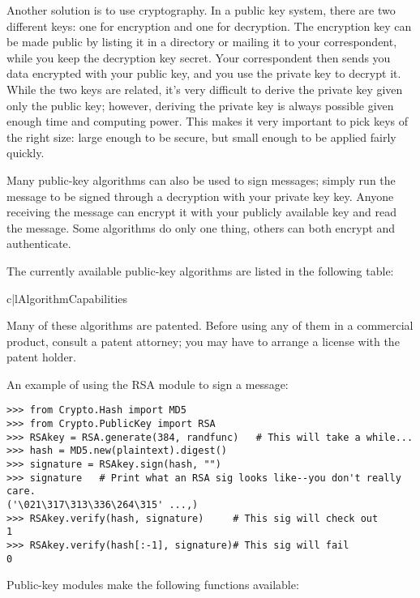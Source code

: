 \documentclass{howto}
\begin{document}
Another solution is to use  cryptography.  In a public
key system, there are two different keys: one for encryption and one for
decryption.  The encryption key can be made public by listing it in a
directory or mailing it to your correspondent, while you keep the
decryption key secret.  Your correspondent then sends you data encrypted
with your public key, and you use the private key to decrypt it.  While
the two keys are related, it's very difficult to derive the private key
given only the public key; however, deriving the private key is always
possible given enough time and computing power.  This makes it very
important to pick keys of the right size: large enough to be secure, but
small enough to be applied fairly quickly.

Many public-key algorithms can also be used to sign messages; simply
run the message to be signed through a decryption with your private
key key.  Anyone receiving the message can encrypt it with your
publicly available key and read the message.  Some algorithms do only
one thing, others can both encrypt and authenticate.

The currently available public-key algorithms are listed in the
following table:

\begin{tableii}{c|l}{}{Algorithm}{Capabilities}
\end{tableii}

Many of these algorithms are patented.  Before using any of them in a
commercial product, consult a patent attorney; you may have to arrange
a license with the patent holder.

An example of using the RSA module to sign a message:
\begin{verbatim}
>>> from Crypto.Hash import MD5
>>> from Crypto.PublicKey import RSA
>>> RSAkey = RSA.generate(384, randfunc)   # This will take a while...
>>> hash = MD5.new(plaintext).digest()
>>> signature = RSAkey.sign(hash, "")
>>> signature   # Print what an RSA sig looks like--you don't really care.
('\021\317\313\336\264\315' ...,)
>>> RSAkey.verify(hash, signature)     # This sig will check out
1
>>> RSAkey.verify(hash[:-1], signature)# This sig will fail
0
\end{verbatim}

Public-key modules make the following functions available:
\end{document}

